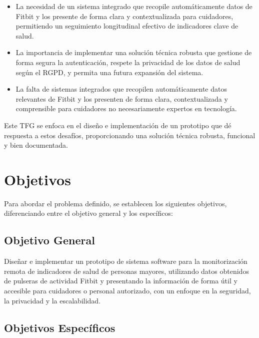 \begin{itemize}
    \item La necesidad de un sistema integrado que recopile automáticamente datos de Fitbit\textsuperscript{\textregistered} y los presente de forma clara y contextualizada para cuidadores, permitiendo un seguimiento longitudinal efectivo de indicadores clave de salud.
    \item La importancia de implementar una solución técnica robusta que gestione de forma segura la autenticación, respete la privacidad de los datos de salud según el RGPD, y permita una futura expansión del sistema.
    \item La falta de sistemas integrados que recopilen automáticamente datos relevantes de Fitbit\textsuperscript{\textregistered} y los presenten de forma clara, contextualizada y comprensible para cuidadores no necesariamente expertos en tecnología.
\end{itemize}

Este TFG se enfoca en el diseño e implementación de un prototipo que dé respuesta a estos desafíos, proporcionando una solución técnica robusta, funcional y bien documentada.

\section{Objetivos}
\label{sec:intro_objetivos}

Para abordar el problema definido, se establecen los siguientes objetivos, diferenciando entre el objetivo general y los específicos:

\subsection{Objetivo General}
\label{subsec:obj_general}

Diseñar e implementar un prototipo de sistema software para la monitorización remota de indicadores de salud de personas mayores, utilizando datos obtenidos de pulseras de actividad Fitbit\textsuperscript{\textregistered} y presentando la información de forma útil y accesible para cuidadores o personal autorizado, con un enfoque en la seguridad, la privacidad y la escalabilidad.

\subsection{Objetivos Específicos}
\label{subsec:obj_especificos}

